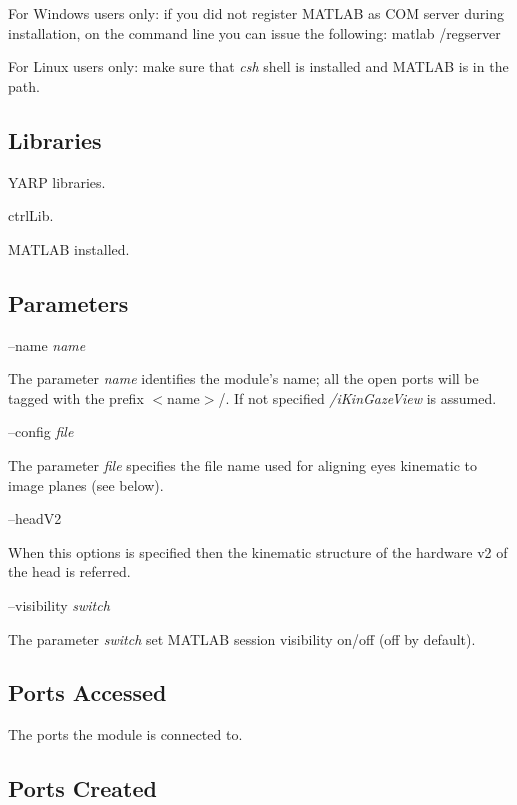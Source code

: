 For Windows users only\+: if you did not register M\+A\+T\+L\+A\+B as C\+O\+M server during installation, on the command line you can issue the following\+: matlab /regserver

For Linux users only\+: make sure that {\itshape csh} shell is installed and M\+A\+T\+L\+A\+B is in the path.\hypertarget{group__icub__tld_lib_sec}{}\subsection{Libraries}\label{group__icub__tld_lib_sec}

\begin{DoxyItemize}
\item Y\+A\+R\+P libraries.
\item ctrl\+Lib.
\item M\+A\+T\+L\+A\+B installed.
\end{DoxyItemize}\hypertarget{group__icub__tld_parameters_sec}{}\subsection{Parameters}\label{group__icub__tld_parameters_sec}
--name {\itshape name} 
\begin{DoxyItemize}
\item The parameter {\itshape name} identifies the module's name; all the open ports will be tagged with the prefix $<$name$>$/. If not specified {\itshape /i\+Kin\+Gaze\+View} is assumed.
\end{DoxyItemize}

--config {\itshape file} 
\begin{DoxyItemize}
\item The parameter {\itshape file} specifies the file name used for aligning eyes kinematic to image planes (see below).
\end{DoxyItemize}

--head\+V2
\begin{DoxyItemize}
\item When this options is specified then the kinematic structure of the hardware v2 of the head is referred.
\end{DoxyItemize}

--visibility {\itshape switch} 
\begin{DoxyItemize}
\item The parameter {\itshape switch} set M\+A\+T\+L\+A\+B session visibility on/off (off by default).
\end{DoxyItemize}\hypertarget{group__icub__signalScope_portsa_sec}{}\subsection{Ports Accessed}\label{group__icub__signalScope_portsa_sec}
The ports the module is connected to.\hypertarget{group__icub__tld_portsc_sec}{}\subsection{Ports Created}\label{group__icub__tld_portsc_sec}

